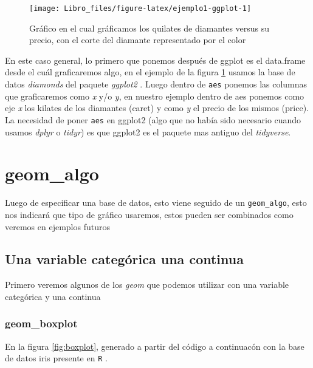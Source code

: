\documentclass[]{book}
\begin{document}
\begin{figure}

{\centering \texttt{[image: Libro\_files/figure-latex/ejemplo1-ggplot-1]} 

}

\caption{Gráfico en el cual gráficamos los quilates de diamantes versus su precio, con el corte del diamante representado por el color}\label{fig:ejemplo1-ggplot}
\end{figure}

En este caso general, lo primero que ponemos después de ggplot es el
data.frame desde el cuál graficaremos algo, en el ejemplo de la figura
\ref{fig:ejemplo1-ggplot} usamos la base de datos \emph{diamonds} del
paquete \emph{ggplot2} \citep{Wickhamggplot}. Luego dentro de
\texttt{aes} ponemos las columnas que graficaremos como \emph{x} y/o
\emph{y}, en nuestro ejemplo dentro de aes ponemos como eje \emph{x} los
kilates de los diamantes (caret) y como \emph{y} el precio de los mismos
(price). La necesidad de poner \texttt{aes} en ggplot2 (algo que no
había sido necesario cuando usamos \emph{dplyr} o \emph{tidyr}) es que
ggplot2 es el paquete mas antiguo del \emph{tidyverse}.

\hypertarget{geom_algo}{%
\section{geom\_algo}\label{geom_algo}}

Luego de especificar una base de datos, esto viene seguido de un
\texttt{geom\_algo}, esto nos indicará que tipo de gráfico usaremos,
estos pueden ser combinados como veremos en ejemplos futuros

\hypertarget{una-variable-categorica-una-continua}{%
\subsection{Una variable categórica una
continua}\label{una-variable-categorica-una-continua}}

Primero veremos algunos de los \emph{geom} que podemos utilizar con una
variable categórica y una continua

\hypertarget{geom_boxplot}{%
\subsubsection{geom\_boxplot}\label{geom_boxplot}}

En la figura \ref{fig:boxplot}, generado a partir del código a
continuacón con la base de datos iris presente en \texttt{R}
\citep{anderson1935irises}.
\end{document}
